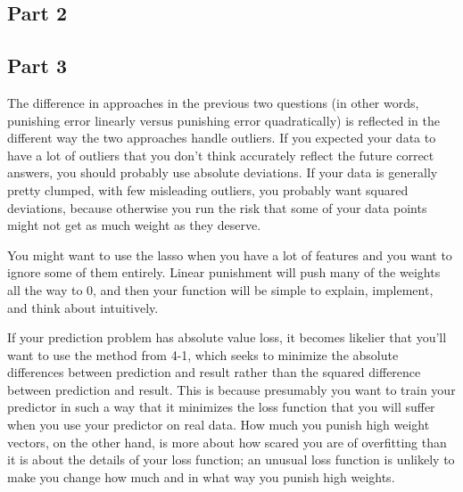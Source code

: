 \documentclass{sigchi}
\begin{document}
\subsection{Part 2}


\subsection{Part 3}

The difference in approaches in the previous two questions (in other words, punishing error linearly versus punishing error quadratically) is reflected in the different way the two approaches handle outliers. If you expected your data to have a lot of outliers that you don't think accurately reflect  the future correct answers, you should probably use absolute deviations. If your data is generally pretty clumped, with few misleading outliers, you probably want squared deviations, because otherwise you run the risk that some of your data points might not get as much weight as they deserve. 

You might want to use the lasso when you have a lot of features and you want to ignore some of them entirely. Linear punishment will push many of the weights all the way to 0, and then your function will be simple to explain, implement, and think about intuitively.

If your prediction problem has absolute value loss, it becomes likelier that you'll want to use the method from 4-1, which seeks to minimize the absolute differences between prediction and result rather than the squared difference between prediction and result. This is because presumably you want to train your predictor in such a way that it minimizes the loss function that you will suffer when you use your predictor on real data. How much you punish high weight vectors, on the other hand, is more about how scared you are of overfitting than it is about the details of your loss function; an unusual loss function is unlikely to make you change how much and in what way you punish high weights.
\end{document}
